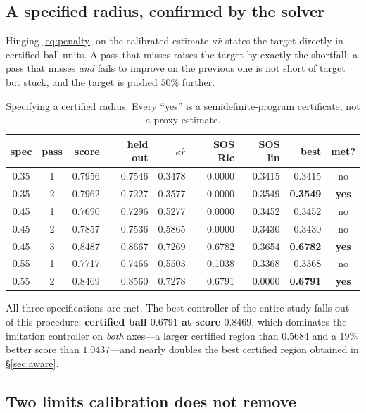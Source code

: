 \documentclass[11pt]{article}
\theoremstyle{plain}
\theoremstyle{definition}
\begin{document}
\subsection{A specified radius, confirmed by the solver}

Hinging \eqref{eq:penalty} on the calibrated estimate $\kappa\hat r$ states the
target directly in certified-ball units. A pass that misses raises the target by
exactly the shortfall; a pass that misses \emph{and} fails to improve on the
previous one is not short of target but stuck, and the target is pushed $50\%$
further.

\begin{table}[t]
\centering
\caption{Specifying a certified radius. Every ``yes'' is a semidefinite-program
certificate, not a proxy estimate.}
\label{tab:spec}
\begin{tabular}{ccrrrrrrc}
\toprule
spec & pass & score & held out & $\kappa\hat r$ & SOS Ric & SOS lin & best & met? \\
\midrule
0.35 & 1 & 0.7956 & 0.7546 & 0.3478 & 0.0000 & 0.3415 & 0.3415 & no \\
0.35 & 2 & 0.7962 & 0.7227 & 0.3577 & 0.0000 & 0.3549 & \textbf{0.3549} & \textbf{yes} \\
0.45 & 1 & 0.7690 & 0.7296 & 0.5277 & 0.0000 & 0.3452 & 0.3452 & no \\
0.45 & 2 & 0.7857 & 0.7536 & 0.5865 & 0.0000 & 0.3430 & 0.3430 & no \\
0.45 & 3 & 0.8487 & 0.8667 & 0.7269 & 0.6782 & 0.3654 & \textbf{0.6782} & \textbf{yes} \\
0.55 & 1 & 0.7717 & 0.7466 & 0.5503 & 0.1038 & 0.3368 & 0.3368 & no \\
0.55 & 2 & 0.8469 & 0.8560 & 0.7278 & 0.6791 & 0.0000 & \textbf{0.6791} & \textbf{yes} \\
\bottomrule
\end{tabular}
\end{table}

All three specifications are met. The best controller of the entire study falls
out of this procedure: \textbf{certified ball $0.6791$ at score $0.8469$}, which
dominates the imitation controller on \emph{both} axes---a larger certified
region than $0.5684$ and a $19\%$ better score than $1.0437$---and nearly
doubles the best certified region obtained in \S\ref{sec:aware}.

\subsection{Two limits calibration does not remove}
\end{document}
